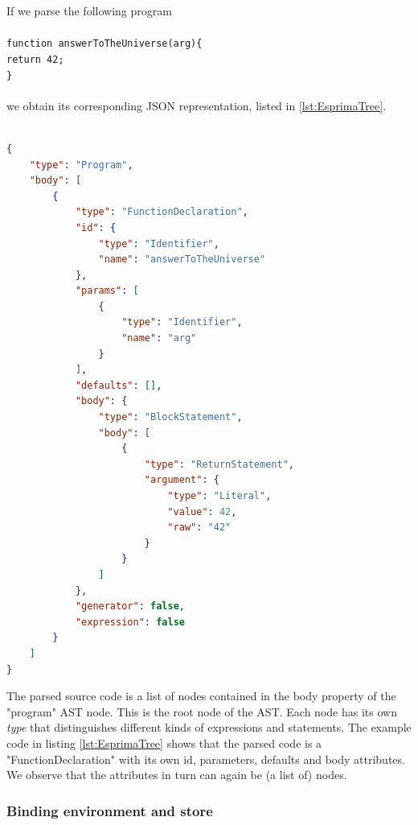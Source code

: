 \begin{exmp}
\label{ex:answerUniverse}
If we parse the following program \\\\
\texttt{function answerToTheUniverse(arg)\{}\\
\phantom{ }\phantom{ }\phantom{ }\phantom{ }\texttt{return 42;}\\
\texttt{\}}\\
\\
we obtain its corresponding JSON representation, listed in \ref{lst:EsprimaTree}.
\\
\begin{lstlisting}[label={lst:EsprimaTree},language=JSON,caption=Parsed JavaScript program AST, mathescape=true]  % float=t?

{
    "type": "Program",
    "body": [
        {
            "type": "FunctionDeclaration",
            "id": {
                "type": "Identifier",
                "name": "answerToTheUniverse"
            },
            "params": [
                {
                    "type": "Identifier",
                    "name": "arg"
                }
            ],
            "defaults": [],
            "body": {
                "type": "BlockStatement",
                "body": [
                    {
                        "type": "ReturnStatement",
                        "argument": {
                            "type": "Literal",
                            "value": 42,
                            "raw": "42"
                        }
                    }
                ]
            },
            "generator": false,
            "expression": false
        }
    ]
}
\end{lstlisting}

The parsed source code is a list of nodes contained in the body property of the "program" AST node. This is the root node of the AST. Each node has its own \textit{type} that distinguishes different kinds of expressions and statements. The example code in listing \ref{lst:EsprimaTree} shows that the parsed code is a "FunctionDeclaration" with its own id, parameters, defaults and body attributes. We observe that the attributes in turn can again be (a list of) nodes.

\end{exmp}

\subsubsection*{Binding environment and store}

